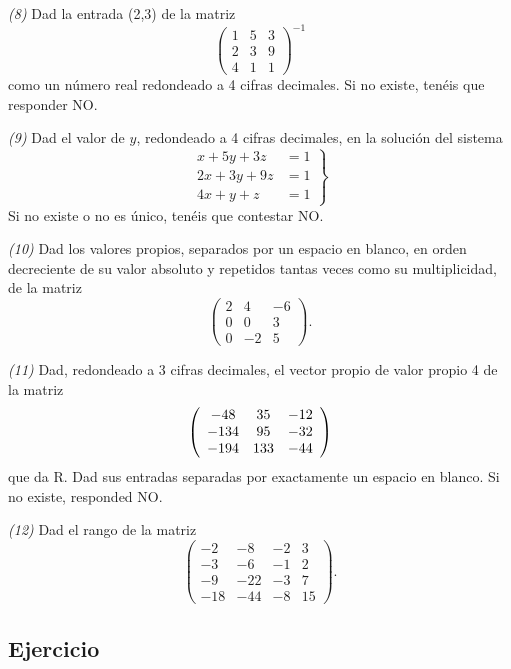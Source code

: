 \documentclass[
]{book}
\theoremstyle{definition}
\theoremstyle{definition}
\theoremstyle{definition}
\theoremstyle{remark}
\begin{document}
\emph{(8)} Dad la entrada (2,3) de la matriz \[\left(\begin{array}{ccc} 1 & 5 & 3\\ 2 & 3 & 9\\ 4 & 1 & 1\end{array} \right)^{-1}\] como un número real redondeado a 4 cifras decimales. Si no existe, tenéis que responder NO.

\emph{(9)} Dad el valor de \(y\), redondeado a 4 cifras decimales, en la solución del sistema
\[
\left.\begin{array}{ll} x+5y+3z & = 1\\ 2x+3y+9z & =1\\ 4x+y+z & = 1\end{array}
\right\}
\]
Si no existe o no es único, tenéis que contestar NO.

\emph{(10)} Dad los valores propios, separados por un espacio en blanco, en orden decreciente de su valor absoluto y repetidos tantas veces como su multiplicidad, de la matriz
\[\left(\begin{array}{ccc}
2 & 4 & -6 \\ 0 & 0 & 3 \\ 0 & -2 & 5
\end{array} \right).\]

\emph{(11)} Dad, redondeado a 3 cifras decimales, el vector propio de valor propio 4 de la matriz
\[\left(\begin{array}{ccc}
-48 & 35 & -12\cr -134 & 95 & -32\cr -194 & 133 &-44
\end{array}
\right)\] que da R. Dad sus entradas separadas por exactamente un espacio en blanco. Si no existe, responded NO.

\emph{(12)} Dad el rango de la matriz \[\left(\begin{array}{cccc}
-2 & -8 & -2 & 3\\ -3 & -6 & -1 & 2\\ -9 &-22 & -3 & 7\\ -18 & -44 & -8 & 15
\end{array}
\right).\]

\hypertarget{ejercicio-3}{%
\subsection*{Ejercicio}\label{ejercicio-3}}
\end{document}
